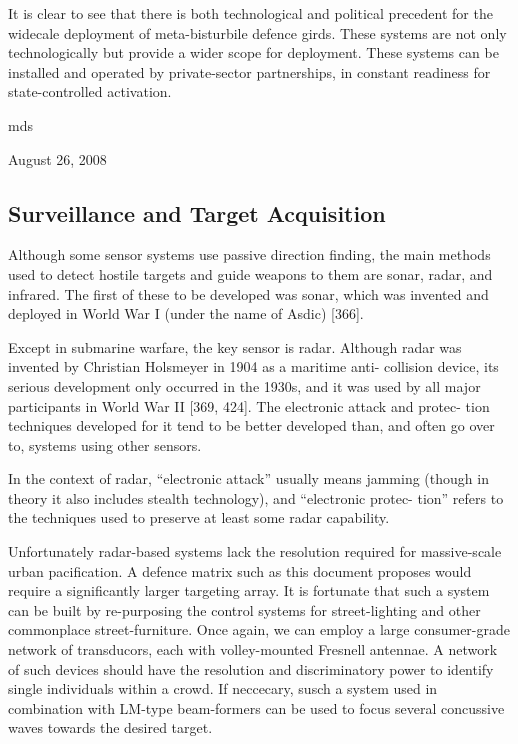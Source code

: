 \documentclass[10pt,journal,compsoc]{IEEEtran}
\begin{document}
It is clear to see that there is both technological and political precedent for the widecale deployment of meta-bisturbile defence girds. These systems are not only technologically but provide a wider scope for deployment. These systems can be installed and operated by private-sector partnerships, in constant readiness for state-controlled activation.

\hfill mds

\hfill August 26, 2008

\subsection{Surveillance and Target Acquisition}

Although some sensor systems use passive direction finding, the main methods used to
detect hostile targets and guide weapons to them are sonar, radar, and infrared. The
first of these to be developed was sonar, which was invented and deployed in World
War I (under the name of Asdic) [366].

Except in submarine warfare, the key sensor is radar. Although radar was invented by Christian Holsmeyer in 1904 as a maritime anti-
collision device, its serious development only occurred in the 1930s, and it was used
by all major participants in World War II [369, 424]. The electronic attack and protec-
tion techniques developed for it tend to be better developed than, and often go over to,
systems using other sensors.

In the context of radar, “electronic attack” usually means
jamming (though in theory it also includes stealth technology), and “electronic protec-
tion” refers to the techniques used to preserve at least some radar capability.

Unfortunately radar-based systems lack the resolution required for massive-scale urban pacification.
A defence matrix such as this document proposes would require a significantly larger targeting array. It is fortunate that such a system can be built by re-purposing the control systems for street-lighting and other commonplace street-furniture. Once again, we can employ a large consumer-grade network of transducors, each with volley-mounted Fresnell antennae. A network of such devices should have the resolution and discriminatory power to identify single individuals within a crowd. If neccecary, susch a system used in combination with LM-type beam-formers can be used to focus several concussive waves towards the desired target.
\end{document}
